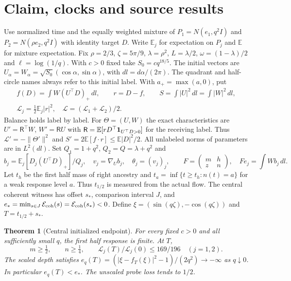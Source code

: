 \documentclass[11pt]{article}
\newtheorem{theorem}{Theorem}
\newcommand{\dd}{\,dl}
\newcommand{\Ll}{\mathcal L}
\newcommand{\E}{\mathbb E}
\begin{document}
\section{Claim, clocks and source results}\label{an04ce5v2:setup}
Use normalized time and the equally weighted mixture of $P_1=N(e_1,q^2I)$ and $P_2=N(\rho e_2,q^2I)$ with identity target $D$. Write $\E_j$ for expectation on $P_j$ and $\E$ for mixture expectation.
Fix $\rho=2/3$, $\zeta=5\pi/9$, $\lambda=\rho^2$, $L=\lambda/2$, $\omega=(1-\lambda)/2$ and $\ell=\log(1/q)$. With $c>0$ fixed take $S_0=cq^{18/5}$. The initial vectors are $U_\alpha=W_\alpha=\sqrt{S_0}(\cos\alpha,\sin\alpha)$, with $dl=d\alpha/(2\pi)$. The quadrant and half-circle names always refer to this initial label. With $a_+=\max(a,0)$, put
\[
 \begin{gathered} f(D)=\int W(U^\top D)_+\dd,\qquad r=D-f,\qquad
 S=\int |U|^2\dd=\int |W|^2\dd,\\
 \Ll_j=\tfrac12\E_j|r|^2,\quad \Ll=(\Ll_1+\Ll_2)/2.\end{gathered}
\]
Balance holds label by label. For $\Theta=(U,W)$ the exact characteristics are
$U'=\mathsf R^\top W$, $W'=\mathsf R U$ with
$\mathsf R=\E[rD^\top{\bf1}_{U^\top D>0}]$ for the receiving label.
Thus $\Ll'=-\|\Theta'\|^2$ and $S'=2\E[f\cdot r]\le \E|D|^2/2$.
All unlabeled norms of parameters are in $L^2(dl)$. Set $Q_1=1+q^2$, $Q_2=Q=\lambda+q^2$ and
\[
 b_j=\E_j[D_j(U^\top D)_+]/Q_j,\quad v_j=\nabla_U b_j,\quad
 \theta_j=(v_j)_j,\qquad
 F=\begin{pmatrix}m&h\\z&n\end{pmatrix},\quad Fe_j=\int W b_j\dd.
\]
Let $t_h$ be the first half mass of right ancestry and $t_a=\inf\{t\ge t_h:n(t)=a\}$ for a weak response level $a$. Thus $t_{1/2}$ is measured from the actual flow. The central coherent witness has offset $s_*$, comparison interval $J$, and $e_*=\min_{s\in J}\mathcal E_{\rm coh}(s)=\mathcal E_{\rm coh}(s_*)<0$. Define $\xi=(\sin(q\zeta),-\cos(q\zeta))$ and $T=t_{1/2}+s_*$.
\begin{theorem}[Central initialized endpoint]\label{an04ce5v2:main}
For every fixed $c>0$ and all sufficiently small $q$, the first half response is finite. At $T$,
\[
 m\ge\tfrac12,\qquad n\ge\tfrac14,\qquad
 \Ll_j(T)/\Ll_j(0)\le169/196\quad(j=1,2).
\]
The scaled depth satisfies
$e_q(T)=(|\xi-f_T(\xi)|^2-1)/(2q^2)\to-\infty$ as $q\downarrow0$.
In particular $e_q(T)<e_*$. The unscaled probe loss tends to $1/2$.
\end{theorem}
\end{document}
